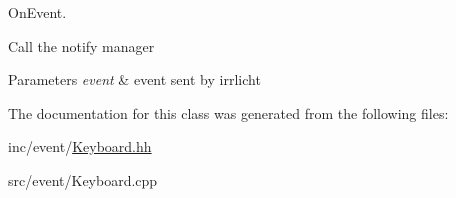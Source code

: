 On\+Event. 

Call the notify manager


\begin{DoxyParams}{Parameters}
{\em event} & event sent by irrlicht \\
\hline
\end{DoxyParams}


The documentation for this class was generated from the following files\+:\begin{DoxyCompactItemize}
\item 
inc/event/\hyperlink{Keyboard_8hh}{Keyboard.\+hh}\item 
src/event/Keyboard.\+cpp\end{DoxyCompactItemize}

